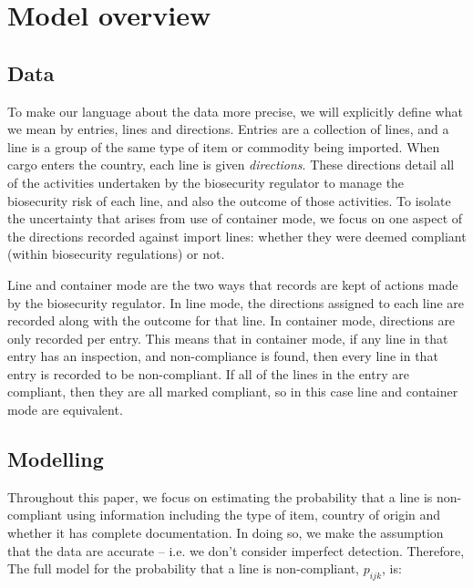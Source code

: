 \documentclass[aoas]{imsart}
\begin{document}
\section{Model overview}
\subsection{Data}\label{sec:data}

To make our language about the data more precise, we will explicitly define what we mean by entries, lines and directions. Entries are a collection of lines, and a line is a group of the same type of item or commodity being imported. When cargo enters the country, each line is given \emph{directions}. These directions detail all of the activities undertaken by the biosecurity regulator to manage the biosecurity risk of each line, and also the outcome of those activities.  {To isolate the uncertainty that arises from use of container mode, we focus on one aspect of the directions recorded against import lines: whether they were deemed compliant (within biosecurity regulations) or not.}

 {Line and container mode are the two ways that records are kept of actions made by the biosecurity regulator.} In line mode, the directions assigned to each line are recorded along with the outcome for that line. In container mode, directions are only recorded per entry. This means that in container mode, if any line in that entry has an inspection, and non-compliance is found, then every line in that entry is recorded to be non-compliant. If all of the lines in the entry are compliant, then they are all marked compliant, so in this case line and container mode are equivalent.

\subsection{Modelling}\label{sec:model}

Throughout this paper, we focus on estimating the probability that a line is non-compliant using information including the type of item, country of origin and whether it has complete documentation. In doing so, we make the assumption that the data are accurate -- i.e. we don't consider imperfect detection. Therefore, The full model for the probability that a line is non-compliant, \(p_{ijk}\), is: 
\end{document}

